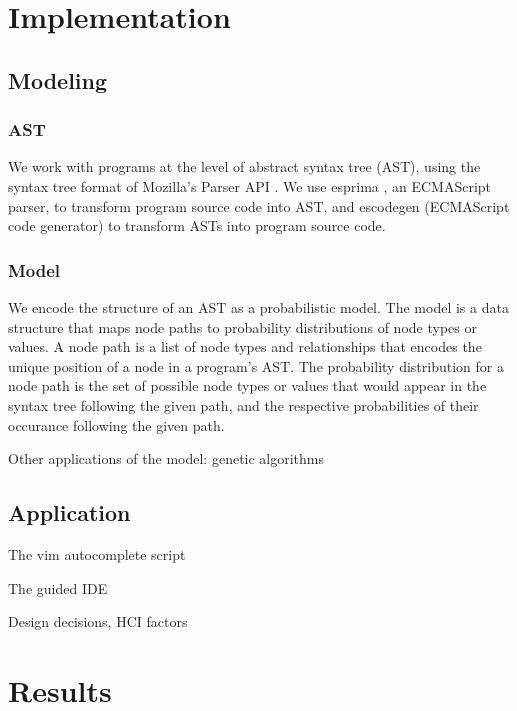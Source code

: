 \documentclass{article}
\begin{document}

\section{Implementation}

\subsection{Modeling}

\subsubsection{AST}

We work with programs at the level of abstract syntax tree (AST), using the
syntax tree format of Mozilla's Parser API \cite{parser api}. We use
esprima \cite{esprima}, an ECMAScript parser, to transform program source code into AST,
and escodegen \cite{escodegen} (ECMAScript code generator) to transform ASTs into program source
code.

\subsubsection{Model}

We encode the structure of an AST as a probabilistic model. The model is a data
structure that maps node paths to probability distributions of node types or
values. A node path is a list of node types and relationships that encodes the
unique position of a node in a program's AST. The probability distribution for a
node path is the set of possible node types or values that would appear in the
syntax tree following the given path, and the respective probabilities of their
occurance following the given path.

%

Other applications of the model: genetic algorithms

\subsection{Application}

The vim autocomplete script

The guided IDE

Design decisions, HCI factors

\section{Results}
\end{document}
